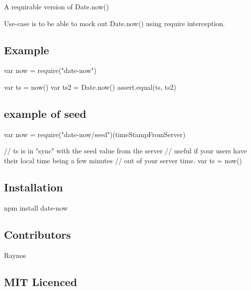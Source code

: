 \href{http://travis-ci.org/Colingo/date-now}{\tt }

\href{http://ci.testling.com/Colingo/date-now}{\tt }

A requirable version of Date.\+now()

Use-\/case is to be able to mock out Date.\+now() using require interception.

\subsection*{Example}


\begin{DoxyCode}
var now = require("date-now")

var ts = now()
var ts2 = Date.now()
assert.equal(ts, ts2)
\end{DoxyCode}


\subsection*{example of seed}


\begin{DoxyCode}
var now = require("date-now/seed")(timeStampFromServer)

// ts is in "sync" with the seed value from the server
// useful if your users have their local time being a few minutes
// out of your server time.
var ts = now()
\end{DoxyCode}


\subsection*{Installation}

{\ttfamily npm install date-\/now}

\subsection*{Contributors}


\begin{DoxyItemize}
\item Raynos
\end{DoxyItemize}

\subsection*{M\+IT Licenced}